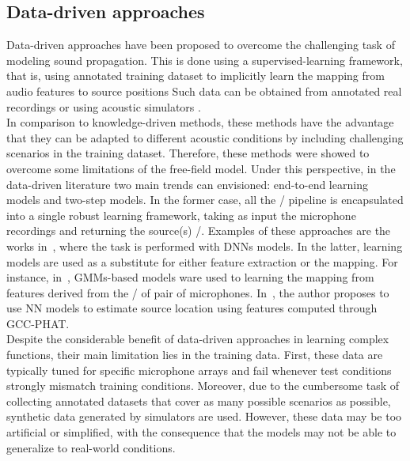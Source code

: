 \subsection{Data-driven approaches}
Data-driven approaches have been proposed to overcome the challenging task of modeling sound propagation.
This is done using a supervised-learning framework, that is, using annotated training dataset to implicitly learn the mapping from audio features to source positions
Such data can be obtained from annotated real recordings  or using acoustic simulators .
\\In comparison to knowledge-driven methods, these methods have the advantage that they can be adapted to different acoustic conditions by including challenging scenarios in the training dataset.
Therefore, these methods were showed to overcome some limitations of the free-field model.
Under this perspective, in the data-driven literature two main trends can envisioned: end-to-end learning models and two-step models.
In the former case, all the \SSL/ pipeline is encapsulated into a single robust learning framework, taking as input the microphone recordings and returning the source(s) \DOAs/.
Examples of these approaches are the works in~, where the task is performed with \acp{DNN} models.
In the latter, learning models are used as a substitute for either feature extraction or the mapping.
For instance, in~, \acp{GMM}-based models ware used to learning the mapping from features derived from the \ReTF/ of pair of microphones.
In~, the author proposes to use \ac{NN} models to estimate source location using features computed through \ac{GCC-PHAT}.
\\Despite the considerable benefit of data-driven approaches in learning complex functions, their main limitation lies in the training data.
First, these data are typically tuned for specific microphone arrays and fail whenever test conditions strongly mismatch training conditions.
Moreover, due to the cumbersome task of collecting annotated datasets that cover as many possible scenarios as possible, synthetic data generated by simulators are used.
However, these data may be too artificial or simplified, with the consequence that the models may not be able to generalize to real-world conditions.


